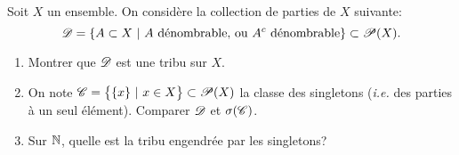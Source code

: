 \begin{td-exo}
    Soit \(X\) un ensemble. On considère la collection de parties de \(X\) suivante:
    \[
    \mathscr{D}=\{A\subset X\ |\ A\mbox{ dénombrable, ou }A^c\mbox{ dénombrable}\}\subset\mathscr{P}(X).
    \]
    \begin{enumerate}
        \item  Montrer que \(\mathscr{D}\) est une tribu sur \(X\).
        \item  On note \(\mathscr{C}=\bigl\{\{x\}\ |\ x\in X\bigr\}\subset\mathscr{P}(X)\) la classe des singletons (\textit{i.e.} des parties à un seul élément). Comparer \(\mathscr{D}\) et \(\sigma(\mathscr{C})\).
        \item  Sur \(\mathbb{N}\), quelle est la tribu engendrée par les singletons?
    \end{enumerate}
\end{td-exo}
